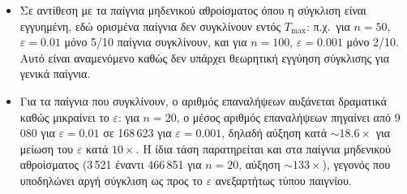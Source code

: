 \begin{itemize}

    \item Σε αντίθεση με τα παίγνια μηδενικού αθροίσματος όπου η σύγκλιση
        είναι εγγυημένη, εδώ ορισμένα παίγνια δεν συγκλίνουν εντός
        $T_{\max}$: π.χ.\ για $n=50$, $\varepsilon=0.01$ μόνο 5/10 παίγνια
        συγκλίνουν, και για $n=100$, $\varepsilon=0.001$ μόνο 2/10. Αυτό
        είναι αναμενόμενο καθώς δεν υπάρχει θεωρητική εγγύηση σύγκλισης για
        γενικά παίγνια.

    \item Για τα παίγνια που συγκλίνουν, ο αριθμός επαναλήψεων αυξάνεται
        δραματικά καθώς μικραίνει το $\varepsilon$: για $n=20$, ο μέσος
        αριθμός επαναλήψεων πηγαίνει από 9\,080 για $\varepsilon=0.01$ σε
        168\,623 για $\varepsilon=0.001$, δηλαδή αύξηση κατά $\sim\!18.6\times$
        για μείωση του $\varepsilon$ κατά $10\times$. Η ίδια τάση παρατηρείται
        και στα παίγνια μηδενικού αθροίσματος (3\,521 έναντι 466\,851 για
        $n=20$, αύξηση $\sim\!133\times$), γεγονός που υποδηλώνει αργή
        σύγκλιση ως προς το $\varepsilon$ ανεξαρτήτως τύπου παιγνίου.

\end{itemize}
